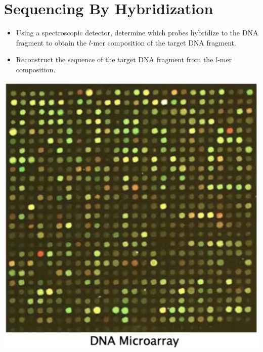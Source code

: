 \documentclass[10pt]{article}
\begin{document}
\section*{Sequencing By Hybridization}
\begin{itemize}
    \item Using a spectroscopic detector, determine which probes hybridize to the DNA fragment to obtain the $l$-mer composition of the target DNA fragment.
    \item Reconstruct the sequence of the target DNA fragment from the $l$-mer composition.
\end{itemize}
\begin{center}
    \includegraphics*[scale=0.6]{W4_8.png}
\end{center}
\end{document}
